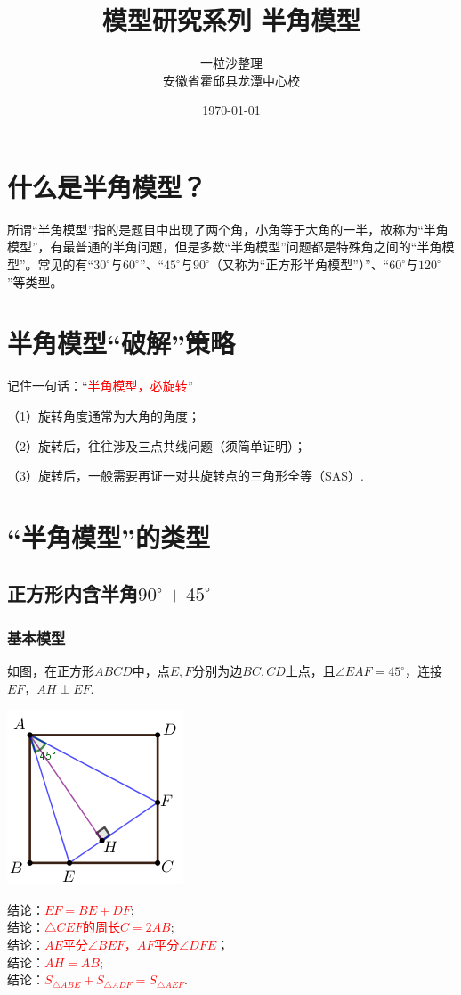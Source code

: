 \documentclass[10pt]{ctexart}
\title{模型研究系列 \quad 半角模型}
\author{一粒沙整理\\安徽省霍邱县龙潭中心校}
\date{\today}
\begin{document}
\maketitle
\tableofcontents


\section{什么是半角模型？}
所谓“半角模型”指的是题目中出现了两个角，小角等于大角的一半，故称为“半角模型”，有最普通的半角问题，但是多数“半角模型”问题都是特殊角之间的“半角模型”。常见的有“$30^\circ$与$60^\circ$”、“$45^\circ$与$90^\circ$（又称为“正方形半角模型”）”、“$60^\circ$与$120^\circ$”等类型。
\section{半角模型“破解”策略}
记住一句话：“\textcolor{red}{半角模型，必旋转}”
\begin{vuyi}

\kaishu （1）旋转角度通常为大角的角度；

（2）旋转后，往往涉及三点共线问题（须简单证明）；

（3）旋转后，一般需要再证一对共旋转点的三角形全等（SAS）.
\end{vuyi}
\section{“半角模型”的类型}
\subsection{正方形内含半角$90^\circ +45^\circ$}
\subsubsection{基本模型}
如图，在正方形$ABCD$中，点$E,F$分别为边$BC,CD$上点，且$\angle EAF=45^\circ$，连接$EF$，$AH\perp EF$.
\begin{minipage}{0.3\textwidth}
	\includegraphics[scale=0.8]{figure/banjiao08}
\end{minipage}
\begin{minipage}{0.4\textwidth}
	结论：\textcolor{red}{$EF=BE+DF$};\\
	结论：\textcolor{red}{$\triangle CEF$的周长$C=2AB$};\\
	结论：\textcolor{red}{$AE$平分$\angle BEF$，$AF$平分$\angle DFE$}；\\
	结论：\textcolor{red}{$AH=AB$};\\
	结论：\textcolor{red}{$S_{\triangle ABE}+S_{\triangle ADF}=S_{\triangle AEF}$}.
\end{minipage}
\end{document}
